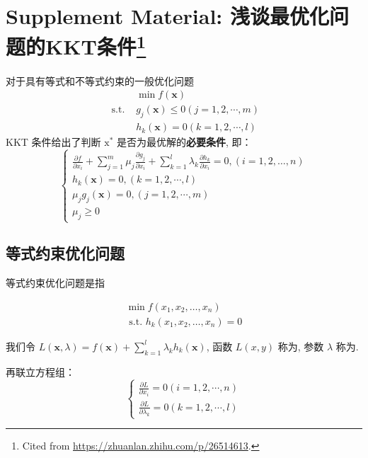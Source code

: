 \section[Supplement Material: 浅谈最优化问题的KKT条件]{Supplement Material: 浅谈最优化问题的KKT条件\footnote{Cited from \url{https://zhuanlan.zhihu.com/p/26514613}.}}


\begin{theorem}[KKT条件]
    对于具有等式和不等式约束的一般优化问题
$$
\begin{aligned}
&\min f(\mathbf{x}) \\
\text { s.t. }& g_{j}(\mathbf{x}) \leq 0(j=1,2, \cdots, m) \\
&h_{k}(\mathbf{x})=0(k=1,2, \cdots, l)
\end{aligned}
$$
KKT 条件给出了判断 $ \mathrm{x}^{*} $ 是否为最优解的\textbf{必要条件}, 即：
$$
\left\{\begin{array}{l}
\frac{\partial f}{\partial x_{i}}+\sum_{j=1}^{m} \mu_{j} \frac{\partial g_{j}}{\partial x_{i}}+\sum_{k=1}^{l} \lambda_{k} \frac{\partial h_{k}}{\partial x_{i}}=0,(i=1,2, \ldots, n) \\
h_{k}(\mathbf{x})=0,(k=1,2, \cdots, l) \\
\mu_{j} g_{j}(\mathbf{x})=0,(j=1,2, \cdots, m) \\
\mu_{j} \geq 0
\end{array}\right.
$$
\end{theorem}


\subsection{等式约束优化问题}

等式约束优化问题是指

\begin{problem}[等式约束优化问题]
    $$
\begin{array}{l}
\min f\left(x_{1}, x_{2}, \ldots, x_{n}\right) \\
\text { s.t. } h_{k}\left(x_{1}, x_{2}, \ldots, x_{n}\right)=0
\end{array}
$$
\end{problem}


我们令 $ L(\mathbf{x}, \lambda)=f(\mathbf{x})+\sum_{k=1}^{l} \lambda_{k} h_{k}(\mathbf{x}) $, 函数 $ L(x, y) $ 称为, 参数 $ \lambda $ 称为.

再联立方程组： 
$$ \left\{\begin{array}{l}\frac{\partial L}{\partial x_{i}}=0(i=1,2, \cdots, n) \\ \frac{\partial L}{\partial \lambda_{k}}=0(k=1,2, \cdots, l)\end{array}\right. $$


